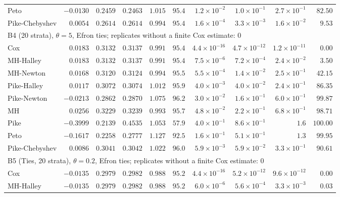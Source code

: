 \begin{landscape}
\begin{longtable}{lrrrrrrrrr}
Peto & $-0.0130$ & $0.2459$ & $0.2463$ & $1.015$ & $95.4$ & $1.2 \times 10^{-2}$ & $1.0 \times 10^{-1}$ & $2.7 \times 10^{-1}$ & $82.50$ \\
Pike-Chebyshev & $0.0054$ & $0.2614$ & $0.2614$ & $0.994$ & $95.4$ & $1.6 \times 10^{-4}$ & $3.3 \times 10^{-3}$ & $1.6 \times 10^{-2}$ & $9.53$ \\
\multicolumn{10}{l}{B4 (20 strata), $\theta = 5$, Efron ties; replicates without a finite Cox estimate: 0} \\
Cox & $0.0183$ & $0.3132$ & $0.3137$ & $0.991$ & $95.4$ & $4.4 \times 10^{-16}$ & $4.7 \times 10^{-12}$ & $1.2 \times 10^{-11}$ & $0.00$ \\
MH-Halley & $0.0183$ & $0.3132$ & $0.3137$ & $0.991$ & $95.4$ & $7.5 \times 10^{-6}$ & $7.2 \times 10^{-4}$ & $2.4 \times 10^{-2}$ & $3.50$ \\
MH-Newton & $0.0168$ & $0.3120$ & $0.3124$ & $0.994$ & $95.5$ & $5.5 \times 10^{-4}$ & $1.4 \times 10^{-2}$ & $2.5 \times 10^{-1}$ & $42.15$ \\
Pike-Halley & $0.0117$ & $0.3072$ & $0.3074$ & $1.012$ & $95.9$ & $4.0 \times 10^{-3}$ & $4.0 \times 10^{-2}$ & $2.4 \times 10^{-1}$ & $86.35$ \\
Pike-Newton & $-0.0213$ & $0.2862$ & $0.2870$ & $1.075$ & $96.2$ & $3.0 \times 10^{-2}$ & $1.6 \times 10^{-1}$ & $6.0 \times 10^{-1}$ & $99.87$ \\
MH & $0.0256$ & $0.3229$ & $0.3239$ & $0.993$ & $95.7$ & $4.8 \times 10^{-2}$ & $2.2 \times 10^{-1}$ & $6.8 \times 10^{-1}$ & $98.71$ \\
Pike & $-0.3999$ & $0.2139$ & $0.4535$ & $1.053$ & $57.9$ & $4.0 \times 10^{-1}$ & $8.6 \times 10^{-1}$ & $1.6$ & $100.00$ \\
Peto & $-0.1617$ & $0.2258$ & $0.2777$ & $1.127$ & $92.5$ & $1.6 \times 10^{-1}$ & $5.1 \times 10^{-1}$ & $1.3$ & $99.95$ \\
Pike-Chebyshev & $0.0086$ & $0.3041$ & $0.3042$ & $1.022$ & $96.0$ & $5.9 \times 10^{-3}$ & $5.9 \times 10^{-2}$ & $3.3 \times 10^{-1}$ & $90.61$ \\
\multicolumn{10}{l}{B5 (Ties, 20 strata), $\theta = 0.2$, Efron ties; replicates without a finite Cox estimate: 0} \\
Cox & $-0.0135$ & $0.2979$ & $0.2982$ & $0.988$ & $95.2$ & $4.4 \times 10^{-16}$ & $5.2 \times 10^{-12}$ & $9.6 \times 10^{-12}$ & $0.00$ \\
MH-Halley & $-0.0135$ & $0.2979$ & $0.2982$ & $0.988$ & $95.2$ & $6.0 \times 10^{-6}$ & $5.6 \times 10^{-4}$ & $3.3 \times 10^{-3}$ & $0.03$ \\

\end{longtable}
\end{landscape}
